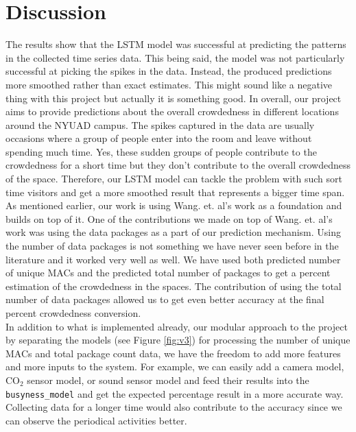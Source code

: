 \documentclass[journal, 12pt]{IEEEtran}
\begin{document}
\section{Discussion} 
\noindent The results show that the LSTM model was successful at predicting the patterns in the collected time series data. This being said, the model was not particularly successful at picking the spikes in the data. Instead, the produced predictions more smoothed rather than exact estimates. This might sound like a negative thing with this project but actually it is something good. In overall, our project aims to provide predictions about the overall crowdedness in different locations around the NYUAD campus. The spikes captured in the data are usually occasions where a group of people enter into the room and leave without spending much time. Yes, these sudden groups of people contribute to the crowdedness for a short time but they don't contribute to the overall crowdedness of the space. Therefore, our LSTM model can tackle the problem with such sort time visitors and get a more smoothed result that represents a bigger time span.\\

\noindent As mentioned earlier, our work is using Wang. et. al’s work as a foundation and builds on top of it. One of the contributions we made on top of Wang. et. al’s work was using the data packages as a part of our prediction mechanism. Using the number of data packages is not something we have never seen before in the literature and it worked very well as well. We have used both predicted number of unique MACs and the predicted total number of packages to get a percent estimation of the crowdedness in the spaces. The contribution of using the total number of data packages allowed us to get even better accuracy at the final percent crowdedness conversion.\\

\noindent In addition to what is implemented already, our modular approach to the project by separating the models (see Figure \ref{fig:v3}) for processing the number of unique MACs and total package count data, we have the freedom to add more features and more inputs to the system. For example, we can easily add a camera model, CO$_2$ sensor model, or sound sensor model and feed their results into the \texttt{busyness\_model} and get the expected percentage result in a more accurate way. Collecting data for a longer time would also contribute to the accuracy since we can observe the periodical activities better.\\
\end{document}
